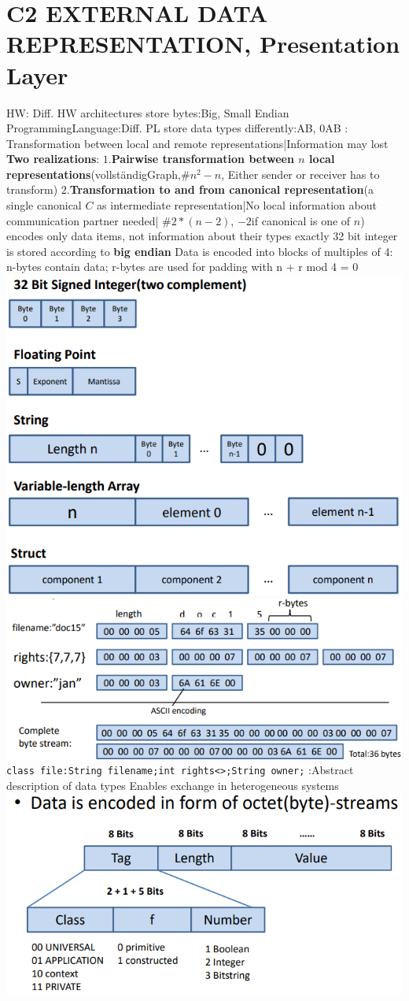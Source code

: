 \section{C2 EXTERNAL DATA REPRESENTATION, Presentation Layer} 
HW: Diff. HW architectures store bytes:Big, Small Endian
ProgrammingLanguage:Diff. PL store data types differently:AB, 0AB
: Transformation between local and remote representations|Information may lost
\textbf{Two realizations}:
$1.$\textbf{Pairwise transformation between $n$ local representations}(vollständigGraph,$\#n^2 - n$, Either sender or receiver has to transform) 
$2.$\textbf{Transformation to and from canonical representation}(a single canonical $C$ as intermediate representation|No local information about communication
partner needed| $\#2*(n-2)$, $ -2$if canonical is one of $n$)
 encodes only data items, not information about their types
\textbar exactly 32 bit integer is stored according to \textbf{big endian} 
\textbar Data is encoded into blocks of multiples of 4: n-bytes contain data; r-bytes are used for padding with n + r mod 4 = 0
\includegraphics[width=.45\linewidth]{chap2_1.png} 
\includegraphics[width=.45\linewidth]{chap2_2.png} 
\lstinline{class file:String filename;int rights<>;String owner;}
:Abstract description of data types \textbar Enables exchange in heterogeneous systems
\includegraphics[width=.45\linewidth]{chap2_3.png}
